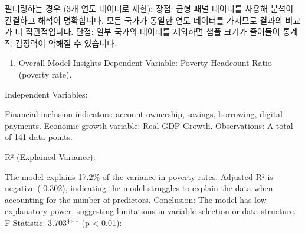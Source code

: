 \documentclass[
]{article}
\providecommand{\tightlist}{%
  \setlength{\itemsep}{0pt}\setlength{\parskip}{0pt}}
\begin{document}
필터링하는 경우 (3개 연도 데이터로 제한): 장점: 균형 패널 데이터를
사용해 분석이 간결하고 해석이 명확합니다. 모든 국가가 동일한 연도
데이터를 가지므로 결과의 비교가 더 직관적입니다. 단점: 일부 국가의
데이터를 제외하면 샘플 크기가 줄어들어 통계적 검정력이 약해질 수
있습니다.

\begin{enumerate}
\def\labelenumi{\arabic{enumi}.}
\tightlist
\item
  Overall Model Insights Dependent Variable: Poverty Headcount Ratio
  (poverty rate).
\end{enumerate}

Independent Variables:

Financial inclusion indicators: account ownership, savings, borrowing,
digital payments. Economic growth variable: Real GDP Growth.
Observations: A total of 141 data points.

R² (Explained Variance):

The model explains 17.2\% of the variance in poverty rates. Adjusted R²
is negative (-0.302), indicating the model struggles to explain the data
when accounting for the number of predictors. Conclusion: The model has
low explanatory power, suggesting limitations in variable selection or
data structure. F-Statistic: 3.703*** (p \textless{} 0.01):
\end{document}
